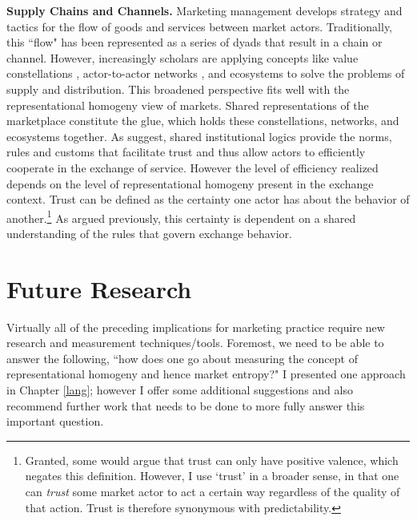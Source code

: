 \textbf{Supply Chains and Channels.}
Marketing management develops strategy and tactics for the flow of goods and services between market actors. Traditionally, this ``flow" has been represented as a series of dyads that result in a chain or channel. However, increasingly scholars are applying concepts like value constellations \citep{normann1993}, actor-to-actor networks \citep{vargo2011}, and ecosystems \citep{mars2012} to solve the problems of supply and distribution. This broadened perspective fits well with the representational homogeny view of markets. Shared representations of the marketplace constitute the glue, which holds these constellations, networks, and ecosystems together. As \citet{vargo2011} suggest, shared institutional logics provide the norms, rules and customs that facilitate trust and thus allow actors to efficiently cooperate in the exchange of service. However the level of efficiency realized depends on the level of representational homogeny present in the exchange context. Trust can be defined as the certainty one actor has about the behavior of another.\footnote{Granted, some would argue that trust can only have positive valence, which negates this definition. However, I use `trust' in a broader sense, in that one can \emph{trust} some market actor to act a certain way regardless of the quality of that action. Trust is therefore synonymous with predictability.} As argued previously, this certainty is dependent on a shared understanding of the rules that govern exchange behavior. 

\section{Future Research}
Virtually all of the preceding implications for marketing practice require new research and measurement techniques/tools. Foremost, we need to be able to answer the following, ``how does one go about measuring the concept of representational homogeny and hence market entropy?" I presented one approach in Chapter \ref{lang}; however I offer some additional suggestions and also recommend further work that needs to be done to more fully answer this important question. 

